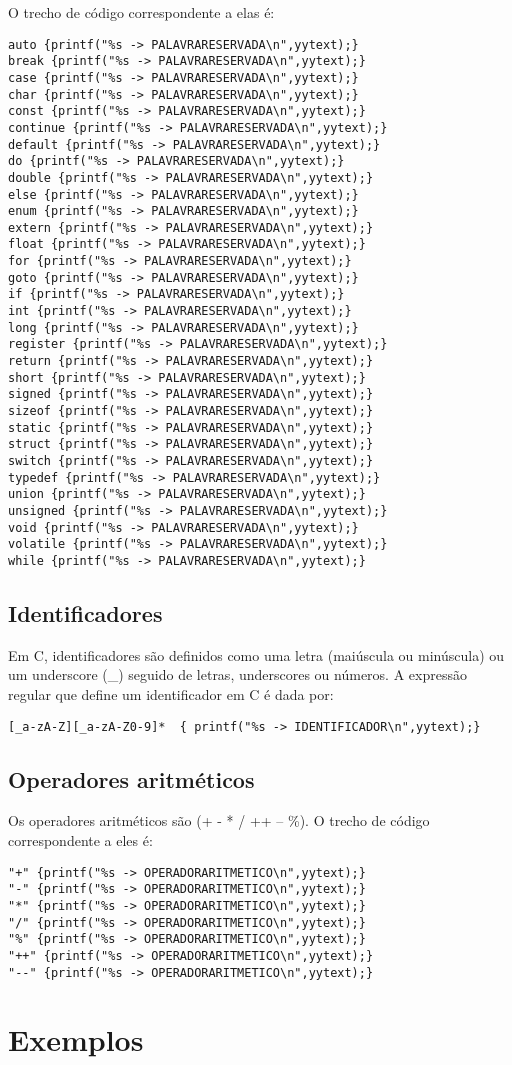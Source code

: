 \documentclass[a4paper,10pt]{article}
\begin{document}
  O trecho de código correspondente a elas é:
  \begin{verbatim}
auto {printf("%s -> PALAVRARESERVADA\n",yytext);}
break {printf("%s -> PALAVRARESERVADA\n",yytext);}
case {printf("%s -> PALAVRARESERVADA\n",yytext);}
char {printf("%s -> PALAVRARESERVADA\n",yytext);}
const {printf("%s -> PALAVRARESERVADA\n",yytext);}
continue {printf("%s -> PALAVRARESERVADA\n",yytext);}
default {printf("%s -> PALAVRARESERVADA\n",yytext);}
do {printf("%s -> PALAVRARESERVADA\n",yytext);}
double {printf("%s -> PALAVRARESERVADA\n",yytext);}
else {printf("%s -> PALAVRARESERVADA\n",yytext);}
enum {printf("%s -> PALAVRARESERVADA\n",yytext);}
extern {printf("%s -> PALAVRARESERVADA\n",yytext);}
float {printf("%s -> PALAVRARESERVADA\n",yytext);}
for {printf("%s -> PALAVRARESERVADA\n",yytext);}
goto {printf("%s -> PALAVRARESERVADA\n",yytext);}
if {printf("%s -> PALAVRARESERVADA\n",yytext);}
int {printf("%s -> PALAVRARESERVADA\n",yytext);}
long {printf("%s -> PALAVRARESERVADA\n",yytext);}
register {printf("%s -> PALAVRARESERVADA\n",yytext);}
return {printf("%s -> PALAVRARESERVADA\n",yytext);}
short {printf("%s -> PALAVRARESERVADA\n",yytext);}
signed {printf("%s -> PALAVRARESERVADA\n",yytext);}
sizeof {printf("%s -> PALAVRARESERVADA\n",yytext);}
static {printf("%s -> PALAVRARESERVADA\n",yytext);}
struct {printf("%s -> PALAVRARESERVADA\n",yytext);}
switch {printf("%s -> PALAVRARESERVADA\n",yytext);}
typedef {printf("%s -> PALAVRARESERVADA\n",yytext);}
union {printf("%s -> PALAVRARESERVADA\n",yytext);}
unsigned {printf("%s -> PALAVRARESERVADA\n",yytext);}
void {printf("%s -> PALAVRARESERVADA\n",yytext);}
volatile {printf("%s -> PALAVRARESERVADA\n",yytext);}
while {printf("%s -> PALAVRARESERVADA\n",yytext);}

  \end{verbatim} 

  \subsection{Identificadores}
  Em C, identificadores são definidos como uma letra (maiúscula ou minúscula) ou um underscore (\_) seguido de letras, underscores ou
  números. A expressão regular que define um identificador em C é dada por:
  \begin{verbatim}
[_a-zA-Z][_a-zA-Z0-9]*	{ printf("%s -> IDENTIFICADOR\n",yytext);}
  \end{verbatim}
  

  \subsection{Operadores aritméticos}
  Os operadores aritméticos são (+  -  *  /  ++  -- \%). O trecho de código correspondente a eles é:
  \begin{verbatim}
"+" {printf("%s -> OPERADORARITMETICO\n",yytext);}
"-" {printf("%s -> OPERADORARITMETICO\n",yytext);}
"*" {printf("%s -> OPERADORARITMETICO\n",yytext);}
"/" {printf("%s -> OPERADORARITMETICO\n",yytext);}
"%" {printf("%s -> OPERADORARITMETICO\n",yytext);}
"++" {printf("%s -> OPERADORARITMETICO\n",yytext);}
"--" {printf("%s -> OPERADORARITMETICO\n",yytext);}
  \end{verbatim}

\section{Exemplos}
\end{document}
